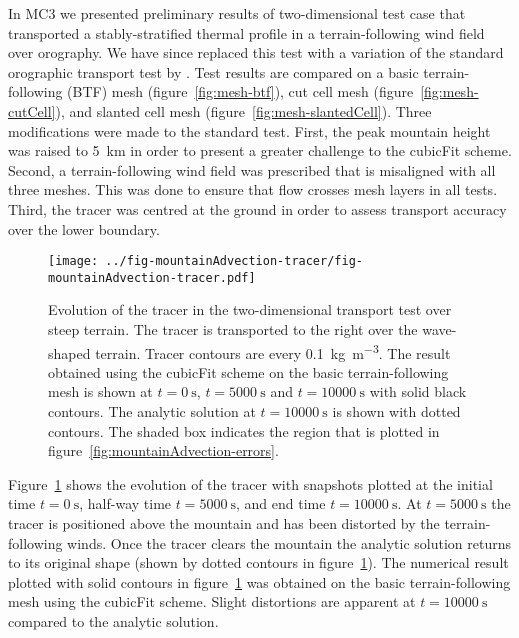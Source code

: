 \documentclass[a4paper,11pt]{article}
\begin{document}
In MC3 we presented preliminary results of two-dimensional test case that transported a stably-stratified thermal profile in a terrain-following wind field over orography.  We have since replaced this test with a variation of the standard orographic transport test by \citet{schaer2002}.  Test results are compared on a basic terrain-following (BTF) mesh (figure~\ref{fig:mesh-btf}), cut cell mesh (figure~\ref{fig:mesh-cutCell}), and slanted cell mesh (figure~\ref{fig:mesh-slantedCell}).  Three modifications were made to the standard test.  First, the peak mountain height was raised to \SI{5}{\kilo\meter} in order to present a greater challenge to the cubicFit scheme.
Second, a terrain-following wind field was prescribed that is misaligned with all three meshes.  This was done to ensure that flow crosses mesh layers in all tests.
Third, the tracer was centred at the ground in order to assess transport accuracy over the lower boundary.

\begin{figure}
	\centering
	\texttt{[image: ../fig-mountainAdvection-tracer/fig-mountainAdvection-tracer.pdf]}
	\caption{Evolution of the tracer in the two-dimensional transport test over steep terrain.  The tracer is transported to the right over the wave-shaped terrain.  Tracer contours are every \SI{0.1}{\kilo\gram\per\meter\cubed}.  The result obtained using the cubicFit scheme on the basic terrain-following mesh is shown at $t=\SI{0}{\second}$, $t=\SI{5000}{\second}$ and $t=\SI{10000}{\second}$ with solid black contours. The analytic solution at $t=\SI{10000}{\second}$ is shown with dotted contours.
	The shaded box indicates the region that is plotted in figure~\ref{fig:mountainAdvection-errors}.}
	\label{fig:mountainAdvection-tracer}
\end{figure}

Figure~\ref{fig:mountainAdvection-tracer} shows the evolution of the tracer with snapshots plotted at the initial time $t = \SI{0}{\second}$, half-way time $t = \SI{5000}{\second}$, and end time $t= \SI{10000}{\second}$.  At $t = \SI{5000}{\second}$ the tracer is positioned above the mountain and has been distorted by the terrain-following winds.  Once the tracer clears the mountain the analytic solution returns to its original shape (shown by dotted contours in figure~\ref{fig:mountainAdvection-tracer}).  The numerical result plotted with solid contours in figure~\ref{fig:mountainAdvection-tracer} was obtained on the basic terrain-following mesh using the cubicFit scheme.  Slight distortions are apparent at $t = \SI{10000}{\second}$ compared to the analytic solution.
\end{document}
